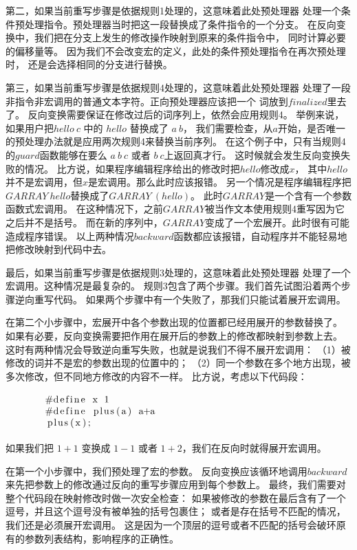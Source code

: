 第二，如果当前重写步骤是依据规则1处理的，这意味着此处预处理器
处理一个条件预处理指令。预处理器当时把这一段替换成了条件指令的一个分支。
在反向变换中，我们把在分支上发生的修改操作映射到原来的条件指令中，
同时计算必要的偏移量等。
因为我们不会改变宏的定义，此处的条件预处理指令在再次预处理时，
还是会选择相同的分支进行替换。

第三，如果当前重写步骤是依据规则4处理的，这意味着此处预处理器
处理了一段非指令非宏调用的普通文本字符。正向预处理器应该把一个
词放到$finalized$里去了。
反向变换需要保证在修改过后的词序列上，依然会应用规则4。
举例来说，如果用户把$hello\ c$ 中的 $hello$ 替换成了 $a\ b$，
我们需要检查，从$a$开始，是否唯一的预处理办法就是应用两次规则4来替换当前序列。
在这个例子中，只有当规则4的$guard$函数能够在要么 $a\ b\ c$ 或者 $b\ c$上返回真才行。
这时候就会发生反向变换失败的情况。
比方说，如果程序编辑程序给出的修改时把$hello$修改成$x$，
其中$hello$并不是宏调用，但$x$是宏调用。那么此时应该报错。
另一个情况是程序编辑程序把$GARRAY\ hello$替换成了$GARRAY\ (hello)$。
此时$GARRAY$是一个含有一个参数函数式宏调用。
在这种情况下，之前$GARRAY$被当作文本使用规则4重写因为它之后并不是括号。
而在新的序列中，$GARRAY$变成了一个宏展开。此时很有可能造成程序错误。
以上两种情况$backward$函数都应该报错，自动程序并不能轻易地把修改映射到代码中去。


最后，如果当前重写步骤是依据规则3处理的，这意味着此处预处理器
处理了一个宏调用。这种情况是最复杂的。
规则3包含了两个步骤。我们首先试图沿着两个步骤逆向重写代码。
如果两个步骤中有一个失败了，那我们只能试着展开宏调用。

在第二个小步骤中，宏展开中各个参数出现的位置都已经用展开的参数替换了。
如果有必要，反向变换需要把作用在展开后的参数上的修改都映射到参数上去。
这时有两种情况会导致逆向重写失败，也就是说我们不得不展开宏调用：
（1）被修改的词并不是宏的参数出现的位置中的；
（2）同一个参数在多个地方出现，被多次修改，但不同地方修改的内容不一样。
比方说，考虑以下代码段：
\begin{equation}\label{eqn:expansion}
  \begin{minipage}{0.8\columnwidth}
\begin{lstlisting}
#define x 1
#define plus(a) a+a
plus(x);
\end{lstlisting}
  \end{minipage}
\end{equation}
如果我们把 $1+1$ 变换成 $1-1$ 或者 $1+2$，我们在反向时就得展开宏调用。

在第一个小步骤中，我们预处理了宏的参数。
反向变换应该循环地调用$backward$来先把参数上的修改通过反向的重写步骤应用到每个参数上。
最终，我们需要对整个代码段在映射修改时做一次安全检查：
如果被修改的参数在最后含有了一个逗号，并且这个逗号没有被单独的括号包裹住；
或者是存在括号不匹配的情况，我们还是必须展开宏调用。
这是因为一个顶层的逗号或者不匹配的括号会破环原有的参数列表结构，影响程序的正确性。


